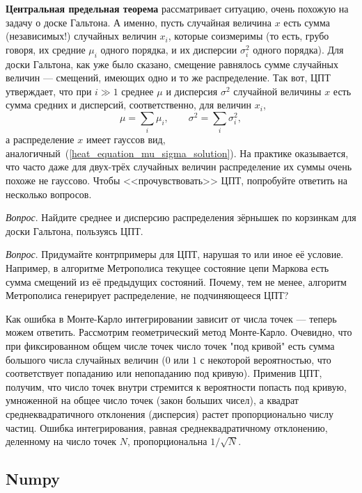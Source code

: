 \documentclass{book}
\begin{document}
\textbf{Центральная предельная теорема} рассматривает ситуацию, очень похожую на задачу о доске
Гальтона. А именно, пусть случайная величина $x$ есть сумма (независимых!) случайных величин $x_i$,
которые соизмеримы (то есть, грубо говоря, их средние $\mu_i$ одного порядка, и их дисперсии
$\sigma_i^2$ одного порядка). Для доски Гальтона, как уже было сказано, смещение равнялось сумме
случайных величин --- смещений, имеющих одно и то же распределение. Так вот, ЦПТ утверждает, что при $i \gg 1$
среднее $\mu$ и дисперсия $\sigma^2$ случайной величины $x$ есть сумма средних и дисперсий,
соответственно, для величин $x_i$,
\begin{equation}
    \mu = \sum_i \mu_i, \qquad \sigma^2 = \sum_i \sigma_i^2,
\end{equation}
а распределение $x$ имеет гауссов вид, аналогичный~(\ref{heat_equation_mu_sigma_solution}). На
практике оказывается, что часто даже для двух-трёх случайных величин распределение их суммы очень
похоже не гауссово. Чтобы <<прочувствовать>> ЦПТ, попробуйте ответить на несколько вопросов.

\textit{Вопрос}. Найдите среднее и дисперсию распределения зёрнышек по корзинкам для доски
Гальтона, пользуясь ЦПТ.

\textit{Вопрос}. Придумайте контрпримеры для ЦПТ, нарушая то или иное её условие. Например, в
алгоритме Метрополиса текущее состояние цепи Маркова есть сумма смещений из её предыдущих
состояний. Почему, тем не менее, алгоритм Метрополиса генерирует распределение, не подчиняющееся
ЦПТ?

Как ошибка в Монте-Карло интегрировании зависит от числа точек --- теперь можем ответить.
Рассмотрим геометрический метод Монте-Карло. Очевидно, что при фиксированном общем числе точек
число точек "под кривой" есть сумма большого числа случайных величин ($0$ или $1$ с некоторой вероятностью, что
соответствует попаданию или непопаданию под кривую). Применив ЦПТ, получим, что число точек внутри
стремится к вероятности попасть под кривую, умноженной на общее число точек (закон больших чисел), а квадрат
среднеквадратичного отклонения (дисперсия) растет пропорционально числу частиц. Ошибка
интегрирования, равная среднеквадратичному отклонению, деленному на число точек $N$,
пропорциональна $1 / \sqrt{N}$.

\subsection{Numpy}
\end{document}
